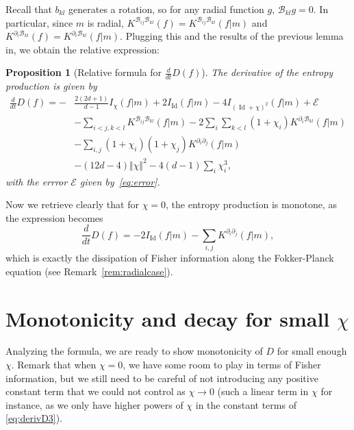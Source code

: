 \documentclass[11pt,a4paper]{article}
\theoremstyle{definition}
\theoremstyle{plain}
\newtheorem{prop}[defi]{Proposition}
\DeclareMathOperator*{\Id}{Id}
\begin{document}
Recall that $b_{kl}$ generates a rotation, so for any radial function $g$, $\mathcal{B}_{kl}g=0$. In particular, since $m$ is radial, $K^{ \mathcal{B}_{ij}\mathcal{B}_{kl}}(f)=K^{ \mathcal{B}_{ij}\mathcal{B}_{kl}}(f\vert m)$ and $K^{\partial_i\mathcal{B}_{kl} }(f)=K^{\partial_i\mathcal{B}_{kl} }(f\vert m)$. Plugging this and the results of the previous lemma in, we obtain the relative expression:
\begin{prop}[Relative formula for $\frac{d}{dt}D(f)$]
The derivative of the entropy production is given by
\begin{align}
\label{eq:derivD3}
    \frac{d}{dt}D(f)
    =-&\frac{2(2d+1)}{d-1}I_\chi(f\vert m)+2I_{\Id}(f\vert m)-4I_{(\Id +\chi)^2}(f\vert m)+\mathcal{E}\\
    &-\sum_{i<j,k<l}K^{ \mathcal{B}_{ij}\mathcal{B}_{kl}}(f\vert m)-2\sum_i\sum_{k<l}(1+\chi_i)K^{\partial_i\mathcal{B}_{kl} }(f\vert m)\nonumber\\
    &-\sum_{i,j}(1+\chi_i)(1+\chi_j)K^{\partial_i\partial_j}(f\vert m)\nonumber\\
    &-(12d-4)\Vert \chi\Vert^2-4(d-1)\sum_i\chi_i^3,\nonumber
\end{align}
with the errror $\mathcal{E}$ given by~\eqref{eq:error}.
\end{prop}
Now we retrieve clearly that for $\chi=0$, the entropy production is monotone, as the expression becomes
$$\frac{d}{dt}D(f)=-2I_{\Id}(f\vert m)-\sum_{i,j}K^{\partial_i \partial_j}(f\vert m),$$
which is exactly the dissipation of Fisher information along the Fokker-Planck equation (see Remark~\ref{rem:radialcase}).


\section{Monotonicity and decay for small $\chi$}
\label{sec:Analysis of the formula and conclusion}

Analyzing the formula, we are ready to show monotonicity of $D$ for small enough $\chi$. Remark that when $\chi=0$, we have some room to play in terms of Fisher information, but we still need to be careful of not introducing any positive constant term that we could not control as $\chi\rightarrow 0$ (such a linear term in $\chi$ for instance, as we only have higher powers of $\chi$ in the constant terms of \eqref{eq:derivD3}).
 
\end{document}
